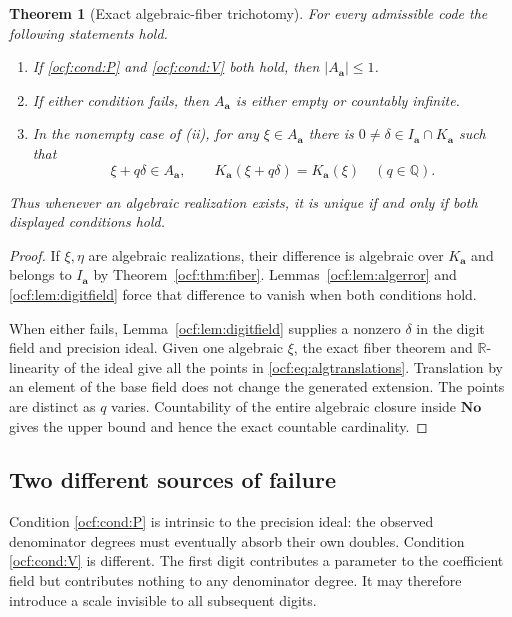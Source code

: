 \documentclass[11pt,a4paper]{article}
\numberwithin{equation}{section}
\newtheorem{theorem}{Theorem}[section]
\theoremstyle{definition}
\theoremstyle{remark}
\newcommand{\No}{\mathbf{No}}
\newcommand{\R}{\mathbb R}
\newcommand{\Q}{\mathbb Q}
\newcommand{\codea}{\boldsymbol a}
\begin{document}
\begin{theorem}[Exact algebraic-fiber trichotomy]\label{ocf:thm:algebraic}
For every admissible code the following statements hold.
\begin{enumerate}[label=\textup{(\roman*)}]
\item If \eqref{ocf:cond:P} and \eqref{ocf:cond:V} both hold, then
$|A_{\codea}|\le1$.
\item If either condition fails, then $A_{\codea}$ is either empty or
countably infinite.
\item In the nonempty case of (ii), for any $\xi\in A_{\codea}$ there is
$0\ne\delta\in I_{\codea}\cap K_{\codea}$ such that
\begin{equation}\label{ocf:eq:algtranslations}
 \xi+q\delta\in A_{\codea},\qquad
 K_{\codea}(\xi+q\delta)=K_{\codea}(\xi)
 \quad(q\in\Q).
\end{equation}
\end{enumerate}
Thus whenever an algebraic realization exists, it is unique if and only
if both displayed conditions hold.
\end{theorem}
\begin{proof}
If $\xi,\eta$ are algebraic realizations, their difference is algebraic
over $K_{\codea}$ and belongs to $I_{\codea}$ by
Theorem~\ref{ocf:thm:fiber}. Lemmas~\ref{ocf:lem:algerror} and
\ref{ocf:lem:digitfield} force that difference to vanish when both conditions
hold.

When either fails, Lemma~\ref{ocf:lem:digitfield} supplies a nonzero $\delta$
in the digit field and precision ideal. Given one algebraic $\xi$, the
exact fiber theorem and $\R$-linearity of the ideal give all the points
in \eqref{ocf:eq:algtranslations}. Translation by an element of the base field
does not change the generated extension. The points are distinct as $q$
varies. Countability of the entire algebraic closure inside $\No$ gives
the upper bound and hence the exact countable cardinality.
\end{proof}

\subsection{Two different sources of failure}

Condition \eqref{ocf:cond:P} is intrinsic to the precision ideal: the observed
denominator degrees must eventually absorb their own doubles. Condition
\eqref{ocf:cond:V} is different. The first digit contributes a parameter to
the coefficient field but contributes nothing to any denominator degree.
It may therefore introduce a scale invisible to all subsequent digits.
\end{document}
